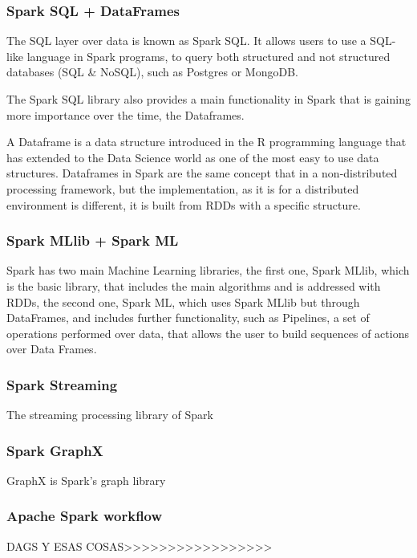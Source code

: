 \documentclass[11pt]{article} %
\begin{document}
      \subsubsection*{Spark SQL + DataFrames}

        The SQL layer over data is known as Spark SQL. It allows users to use a SQL-like language in Spark programs, to query both structured and not structured databases (SQL \& NoSQL), such as Postgres or MongoDB.

        The Spark SQL library also provides a main functionality in Spark that is gaining more importance over the time, the Dataframes.

        A Dataframe is a data structure introduced in the R programming language that has extended to the Data Science world as one of the most easy to use data structures. Dataframes in Spark are the same concept that in a non-distributed processing framework, but the implementation, as it is for a distributed environment is different, it is built from RDDs with a specific structure.

      \subsubsection*{Spark MLlib + Spark ML}

        Spark has two main Machine Learning libraries, the first one, Spark MLlib, which is the basic library, that includes the main algorithms and is addressed with RDDs, the second one, Spark ML, which uses Spark MLlib but through DataFrames, and includes further functionality, such as Pipelines, a set of operations performed over data, that allows the user to build sequences of actions over Data Frames.

      \subsubsection{Spark Streaming}

        The streaming processing library of Spark


      \subsubsection*{Spark GraphX}

        GraphX is Spark's graph library

      \subsubsection{Apache Spark workflow}
      DAGS Y ESAS COSAS>>>>>>>>>>>>>>>>>
\end{document}
